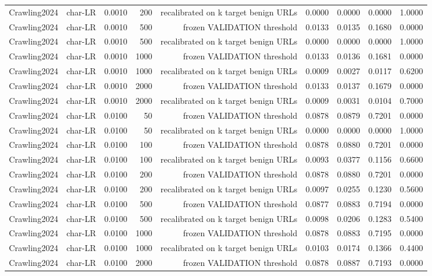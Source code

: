 \begin{table}[t]
\begin{tabular}{llrrrrrrr}
Crawling2024 & char-LR & 0.0010 & 200 & recalibrated on k target benign URLs & 0.0000 & 0.0000 & 0.0000 & 1.0000 \\
Crawling2024 & char-LR & 0.0010 & 500 & frozen VALIDATION threshold & 0.0133 & 0.0135 & 0.1680 & 0.0000 \\
Crawling2024 & char-LR & 0.0010 & 500 & recalibrated on k target benign URLs & 0.0000 & 0.0000 & 0.0000 & 1.0000 \\
Crawling2024 & char-LR & 0.0010 & 1000 & frozen VALIDATION threshold & 0.0133 & 0.0136 & 0.1681 & 0.0000 \\
Crawling2024 & char-LR & 0.0010 & 1000 & recalibrated on k target benign URLs & 0.0009 & 0.0027 & 0.0117 & 0.6200 \\
Crawling2024 & char-LR & 0.0010 & 2000 & frozen VALIDATION threshold & 0.0133 & 0.0137 & 0.1679 & 0.0000 \\
Crawling2024 & char-LR & 0.0010 & 2000 & recalibrated on k target benign URLs & 0.0009 & 0.0031 & 0.0104 & 0.7000 \\
Crawling2024 & char-LR & 0.0100 & 50 & frozen VALIDATION threshold & 0.0878 & 0.0879 & 0.7201 & 0.0000 \\
Crawling2024 & char-LR & 0.0100 & 50 & recalibrated on k target benign URLs & 0.0000 & 0.0000 & 0.0000 & 1.0000 \\
Crawling2024 & char-LR & 0.0100 & 100 & frozen VALIDATION threshold & 0.0878 & 0.0880 & 0.7201 & 0.0000 \\
Crawling2024 & char-LR & 0.0100 & 100 & recalibrated on k target benign URLs & 0.0093 & 0.0377 & 0.1156 & 0.6600 \\
Crawling2024 & char-LR & 0.0100 & 200 & frozen VALIDATION threshold & 0.0878 & 0.0880 & 0.7201 & 0.0000 \\
Crawling2024 & char-LR & 0.0100 & 200 & recalibrated on k target benign URLs & 0.0097 & 0.0255 & 0.1230 & 0.5600 \\
Crawling2024 & char-LR & 0.0100 & 500 & frozen VALIDATION threshold & 0.0877 & 0.0883 & 0.7194 & 0.0000 \\
Crawling2024 & char-LR & 0.0100 & 500 & recalibrated on k target benign URLs & 0.0098 & 0.0206 & 0.1283 & 0.5400 \\
Crawling2024 & char-LR & 0.0100 & 1000 & frozen VALIDATION threshold & 0.0878 & 0.0883 & 0.7195 & 0.0000 \\
Crawling2024 & char-LR & 0.0100 & 1000 & recalibrated on k target benign URLs & 0.0103 & 0.0174 & 0.1366 & 0.4400 \\
Crawling2024 & char-LR & 0.0100 & 2000 & frozen VALIDATION threshold & 0.0878 & 0.0887 & 0.7193 & 0.0000 \\

\end{tabular}
\end{table}
